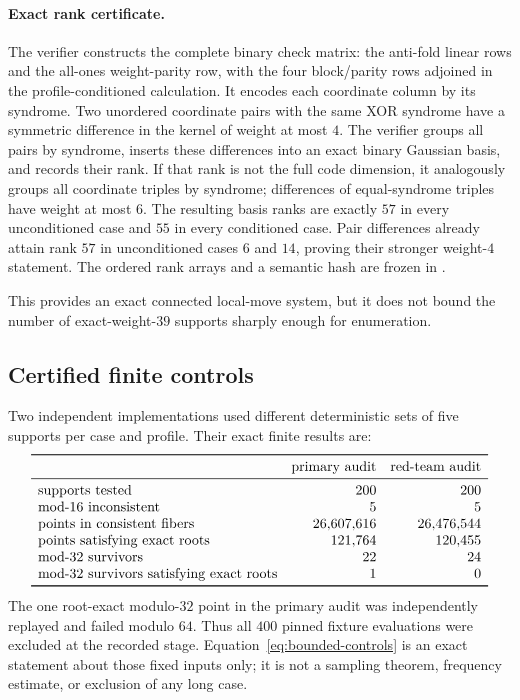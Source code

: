 \documentclass[11pt]{article}
\theoremstyle{remark}
\begin{document}
\paragraph{Exact rank certificate.}
The verifier
constructs the complete binary check matrix: the anti-fold linear rows and
the all-ones weight-parity row, with the four block/parity rows adjoined in
the profile-conditioned calculation.  It encodes each coordinate column by
its syndrome.  Two unordered coordinate pairs with the same XOR syndrome
have a symmetric difference in the kernel of weight at most $4$.
The verifier groups all pairs by syndrome, inserts these differences into
an exact binary Gaussian basis, and records their rank.  If that rank is
not the full code dimension, it analogously groups all coordinate triples
by syndrome; differences of equal-syndrome triples have weight at most
$6$.  The resulting basis ranks are exactly $57$ in every unconditioned
case and $55$ in every conditioned case.  Pair differences already attain
rank $57$ in unconditioned cases $6$ and $14$, proving their stronger
weight-$4$ statement.  The ordered rank arrays and a semantic hash are
frozen in .

This provides an exact connected local-move system, but it does not bound
the number of exact-weight-$39$ supports sharply enough for enumeration.

\subsection{Certified finite controls}

Two independent implementations used different deterministic sets of five
supports per case and profile.  Their exact finite results are:
\begin{equation}
\label{eq:bounded-controls}
\begin{array}{lrr}
\toprule
&\text{primary audit}&\text{red-team audit}\\
\midrule
\text{supports tested}&200&200\\
\text{mod-$16$ inconsistent}&5&5\\
\text{points in consistent fibers}&26{,}607{,}616&26{,}476{,}544\\
\text{points satisfying exact roots}&121{,}764&120{,}455\\
\text{mod-$32$ survivors}&22&24\\
\text{mod-$32$ survivors satisfying exact roots}&1&0\\
\bottomrule
\end{array}
\end{equation}
The one root-exact modulo-$32$ point in the primary audit was independently
replayed and failed modulo $64$.  Thus all $400$ pinned fixture evaluations
were excluded at the recorded stage.  Equation~\eqref{eq:bounded-controls} is an exact
statement about those fixed inputs only; it is not a sampling theorem,
frequency estimate, or exclusion of any long case.
\end{document}
